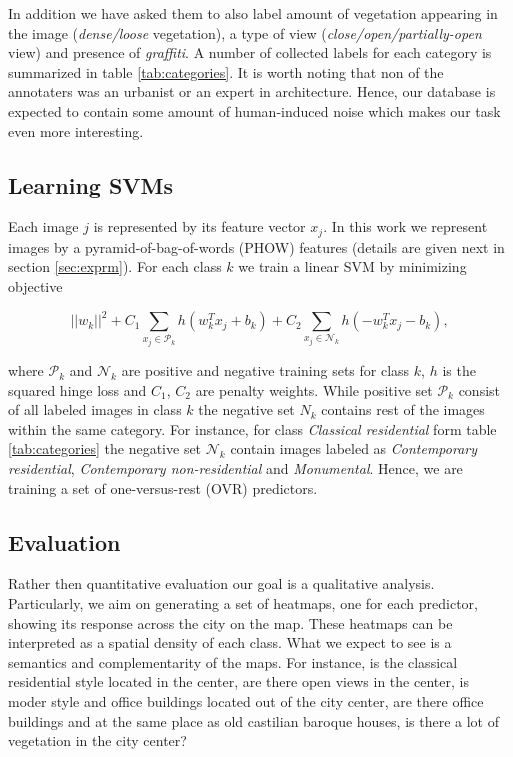 \documentclass[runningheads, table]{llncs}
\begin{document}
  In addition we have asked them to also label amount of vegetation appearing in the image (\emph{dense/loose} vegetation), a type of view (\emph{close/open/partially-open} view) and presence of \emph{graffiti}. A number of collected labels for each category is summarized in table \ref{tab:categories}. It is worth noting that non of the annotaters was an urbanist or an expert in architecture. Hence, our database is expected to contain some amount of human-induced noise which makes our task even more interesting.

\subsection{Learning SVMs}
  \vspace{-1mm}
  Each image $j$ is represented by its feature vector $x_j$. In this work we represent images by a pyramid-of-bag-of-words (PHOW) features (details are given next in section \ref{sec:exprm}). For each class $k$ we train a linear SVM by minimizing objective

\begin{equation}
  ||w_k||^{2} +C_1\sum_{x_j \in \mathcal P_k}h
              \left(
                w_k^T x_j +b_k
              \right)
              +C_2\sum_{x_j \in \mathcal N_k}h
              \left(
                -w_k^T x_j - b_k
              \right),   
  \label{eq:obj} 
\end{equation}

\noindent
where $\mathcal{P}_k$ and $\mathcal{N}_k$ are positive and negative training sets for class $k$, $h$ is the squared hinge loss and $C_1$, $C_2$ are penalty weights. While positive set $\mathcal{P}_k$ consist of all labeled images in class $k$ the negative set $N_k$ contains rest of the images within the same category. For instance, for class \emph{Classical residential} form table \ref{tab:categories} the negative set $\mathcal{N}_k$ contain images labeled as \emph{Contemporary residential}, \emph{Contemporary non-residential} and \emph{Monumental}. Hence, we are training a set of one-versus-rest (OVR) predictors. 

\subsection{Evaluation}
\vspace{-1mm}
Rather then quantitative evaluation our goal is a qualitative analysis. Particularly, we aim on generating a set of heatmaps, one for each predictor, showing its response across the city on the map. These heatmaps can be interpreted as a spatial density of each class. What we expect to see is a semantics and complementarity of the maps. For instance, is the classical residential style located in the center, are there open views in the center, is moder style and office buildings located out of the city center, are there office buildings and at the same place as old castilian baroque houses, is there a lot of vegetation in the city center?
\end{document}
